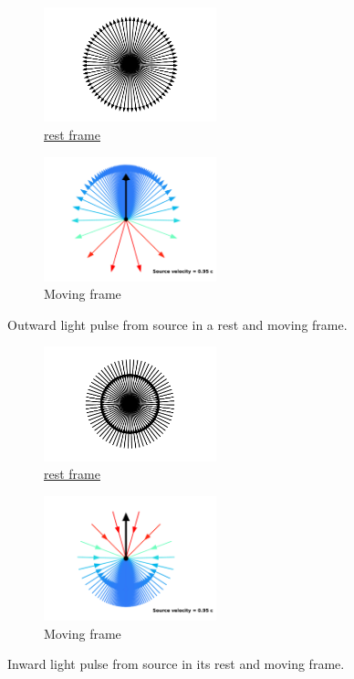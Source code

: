 \begin{figure}[H]
	\begin{subfigure}{.49\textwidth}
		\centering
		\includegraphics[width = 5cm]{images/pdf/Rest_velocities.pdf}
		\caption{\hyperlink{def-proper-frame}{rest frame}}
	\end{subfigure}
	\begin{subfigure}{.49\textwidth}
		\centering
		\includegraphics[width = 5cm]{images/pdf/Aberrated_velocities.pdf}
		\caption{Moving frame}
	\end{subfigure}
	\caption{Outward light pulse from source in a rest and moving frame.}
	\label{fig: Relativistic Beaming}
\end{figure}

\begin{figure}[H]
	\begin{subfigure}{.49\textwidth}
		\centering
		\includegraphics[width = 5cm]{images/pdf/Rest_velocities_inwards.pdf}
		\caption{\hyperlink{def-proper-frame}{rest frame}}
	\end{subfigure}
	\begin{subfigure}{.49\textwidth}
		\centering
		\includegraphics[width = 5cm]{images/pdf/Aberrated_velocities_inwards.pdf}
		\caption{Moving frame}
	\end{subfigure}
	\caption{Inward light pulse from source in its rest and moving frame.}
	\label{fig: Relativistic Beaming Recieved}
\end{figure}


